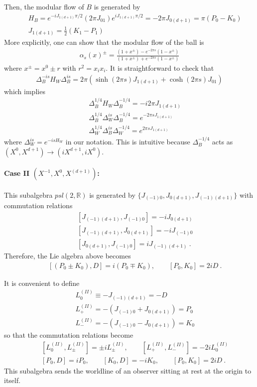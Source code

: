 \documentclass[a4paper,11pt]{article}
\theoremstyle{definition}
\newcommand{\nn}{\nonumber}
\begin{document}
Then, the modular flow of $B$ is generated by
\begin{eqnarray}
    &&H_B=e^{-i J_{1(d+1)}\pi/2}(2\pi J_{01})e^{i J_{1(d+1)}\pi/2}=-2\pi J_{0(d+1)}=\pi(P_0-K_0)\nn\\
    &&J_{1(d+1)}=\frac{1}{2}(K_1-P_1)
\end{eqnarray}
More explicitly, one can show that the modular flow of the ball is 
\begin{eqnarray}
    \alpha_s(x)^\pm=\frac{(1+x^\pm)-e^{-2\pi s}(1-x^\pm)}{(1+x^\pm)+e^{-2\pi s}(1-x^\pm)}
\end{eqnarray}
where $x^\pm=x^0\pm r$ with $r^2=x_ix_i$. It is straightforward to check that 
\begin{eqnarray}
    \Delta_B^{-i s}H_W\Delta_B^{is}=2\pi(\sinh(2\pi s)J_{1(d+1)}+\cosh(2\pi s)J_{01})
\end{eqnarray}
which implies
\begin{eqnarray}
    &&\Delta_B^{1/4}H_W \Delta_B^{-1/4}=-i2\pi J_{1(d+1)}\nn\\
    &&\Delta_B^{1/4}\Delta_W^{is}\Delta_B^{-1/4}=e^{-2\pi s J_{1(d+1)}}\\
    &&\Delta_W^{1/4}\Delta_B^{is}\Delta_W^{-1/4}=e^{2\pi s J_{1(d+1)}}
\end{eqnarray}
where $\Delta_W^{is} = e^{-is H_W}$ in our notation. This is intuitive because $\Delta_B^{-1/4}$ acts as $(X^0,X^{d+1})\to (i X^{d+1},i X^0)$.

\paragraph{Case II $(X^{-1},X^0,X^{(d+1)})$:} This subalgebra $psl(2,\mathbb{R})$ is generated by $\{J_{(-1)0},J_{0(d+1)},J_{(-1)(d+1)}\}$ with commutation relations
\begin{eqnarray}\label{caseIIalg}
        &&[J_{(-1)(d+1)},J_{(-1)0}]=-iJ_{0(d+1)}\nn\\
        &&[J_{(-1)(d+1)},J_{0(d+1)}]=-iJ_{(-1)0}\nn\\
        &&[J_{0(d+1)},J_{(-1)0}]=iJ_{(-1)(d+1)}\ .        
\end{eqnarray}
Therefore, the Lie algebra above becomes
\begin{eqnarray}
    &&[(P_0\pm K_0),D]=i(P_0\mp K_0),\qquad [P_0,K_0]=2i D\ .
\end{eqnarray}

It is convenient to define 
\begin{eqnarray}
&&L_0^{(II)}\equiv -J_{(-1)(d+1)}=-D\nn\\
&&L_+^{(II)}=-(J_{(-1)0}+ J_{0(d+1)})=P_0\nn\\
&&L_-^{(II)}=-(J_{(-1)0}- J_{0(d+1)})=K_0
\end{eqnarray}
 so that the commutation relations become
\begin{eqnarray}
    &&[L^{(II)}_0,L^{(II)}_\pm]=\pm i L^{(II)}_\pm,\qquad [L_+^{(II)},L_-^{(II)}]=-2i L_0^{(II)} \nn\\
    &&[P_0,D]=iP_0,\qquad [K_0,D]=-iK_0,\qquad [P_0,K_0]=2i D\ .
\end{eqnarray}
This subalgebra sends the worldline of an observer sitting at rest at the origin to itself. 
\end{document}
